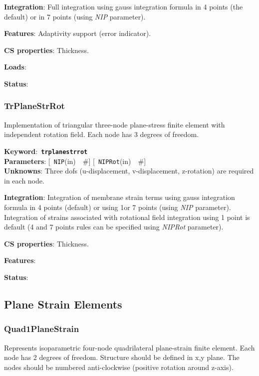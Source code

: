 \documentclass[a4paper]{article}
\newcommand{\descitem}[1]{{\noindent \bf #1}:}
\newcommand{\elemkeyword}[1]{\descitem{Keyword}~{\bf \texttt{#1}}}
\newcommand{\elemparam}[2]{{{\texttt{#1}\tiny (#2)}~~\#}}
\newcommand{\optelemparam}[2]{{[~\elemparam{#1}{#2}]}}
\newcommand{\param}[1]{{\em #1}}
\begin{document}
\descitem{Integration}
Full integration using gauss integration formula in 4 points (the
default) or in 7 points (using \param{NIP} parameter).

\descitem{Features} Adaptivity support (error indicator).

\descitem{CS properties} Thickness. 

\descitem{Loads} 

\descitem{Status} 

\subsubsection{TrPlaneStrRot}
Implementation of triangular three-node  plane-stress 
finite element with independent rotation field.
Each node has 3 degrees of freedom.

\elemkeyword{trplanestrrot}\\
\descitem{Parameters} \optelemparam{NIP}{in} \optelemparam{NIPRot}{in}\\
\descitem{Unknowns}
Three dofs (u-displacement, v-displacement, z-rotation) are required in each node.


\descitem{Integration}
Integration of membrane strain terms using gauss integration formula
in 4 points (default) or using 1or 7 points (using \param{NIP} parameter).
Integration of strains associated with rotational field 
integration using 1 point is default (4 and 7 points rules can be
specified using \param{NIPRot} parameter).

\descitem{CS properties} Thickness. 

\descitem{Features} 

\descitem{Status} 

\subsection{Plane Strain Elements}

\subsubsection{Quad1PlaneStrain}
Represents isoparametric four-node quadrilateral plane-strain
finite element. Each node has 2 degrees of freedom.
Structure should be defined in x,y plane. 
The nodes should be numbered anti-clockwise (positive rotation around
z-axis). 
\end{document}
